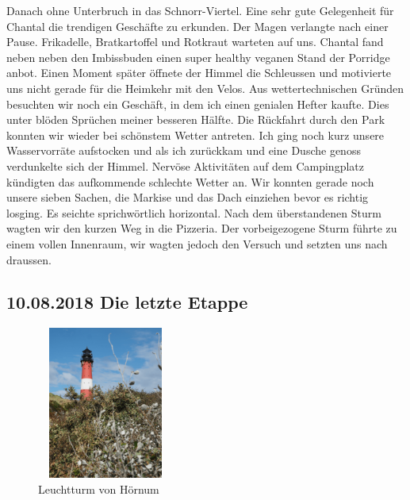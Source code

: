 Danach ohne Unterbruch in das Schnorr-Viertel.
Eine sehr gute Gelegenheit für Chantal die trendigen Geschäfte zu erkunden.
Der Magen verlangte nach einer Pause. 
Frikadelle, Bratkartoffel und Rotkraut warteten auf uns.
Chantal fand neben neben den Imbissbuden einen super healthy veganen Stand der Porridge anbot.
Einen Moment später öffnete der Himmel die Schleussen und motivierte uns nicht gerade für die Heimkehr mit den Velos.
Aus wettertechnischen Gründen besuchten wir noch ein Geschäft, in dem ich einen genialen Hefter kaufte. 
Dies unter blöden Sprüchen meiner besseren Hälfte.
Die Rückfahrt durch den Park konnten wir wieder bei schönstem Wetter antreten.
Ich ging noch kurz unsere Wasservorräte aufstocken und als ich zurückkam und eine Dusche genoss verdunkelte sich der Himmel.
Nervöse Aktivitäten auf dem Campingplatz kündigten das aufkommende schlechte Wetter an.
Wir konnten gerade noch unsere sieben Sachen, die Markise und das Dach einziehen bevor es richtig losging.
Es seichte sprichwörtlich horizontal.
Nach dem überstandenen Sturm wagten wir den kurzen Weg in die Pizzeria.
Der vorbeigezogene Sturm führte zu einem vollen Innenraum, wir wagten jedoch den Versuch und setzten uns nach draussen.
\newpage
\subsection{10.08.2018 Die letzte Etappe}

\begin{figure} 
  \begin{centering}
    \includegraphics[width=0.4\textwidth, height=5cm, keepaspectratio]{../Bilder/Sylt/34.png}
    \caption{Leuchtturm von Hörnum}
  \end{centering}
\end{figure} 

